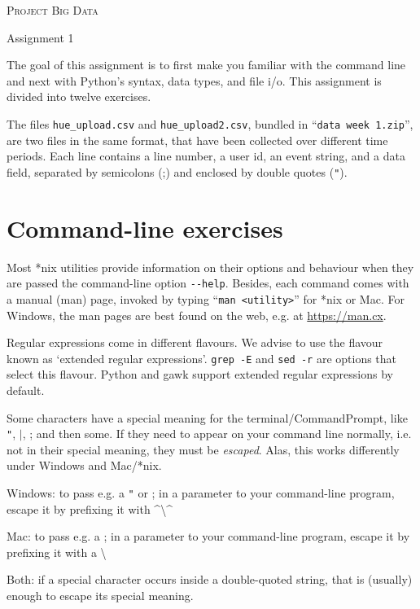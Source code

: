 \documentclass[a4paper]{report}
\theoremstyle{definition}
\newcommand{\blankline}{\par\vspace{5mm}}
\newcommand{\doublequote}{\texttt{"}}
\newcommand{\pipe}{$\vert$}
\begin{document}
	
	\begin{center}
		\textsc{\Large Project Big Data}
		\blankline
		
		{\large Assignment 1}
	\end{center}
	
	\blankline \noindent The goal of this assignment is to first make you familiar with the command line and next with Python’s syntax, data types, and file i/o. This assignment is divided into twelve exercises.
	
	The files \texttt{hue\_upload.csv} and \texttt{hue\_upload2.csv}, bundled in ``\texttt{data week 1.zip}'',
	are two files in the same format, that have been collected over different time periods. Each line contains a line number, a user id, an event string, and a data field, separated by semicolons (;) and enclosed by double quotes (\doublequote{}).
	
	\section*{Command-line exercises}
	\label{command-line-exercises}
	
	Most *nix utilities provide information on their options and behaviour when
	they are passed the command-line option \texttt{-{}-help}. Besides, each
	command comes with a manual (man) page, invoked by typing ``\texttt{man
		<utility>}'' for
	*nix or Mac. For Windows, the man pages are best found on the web, e.g.
	at \url{https://man.cx}.
	
	Regular expressions come in different flavours. We advise to use the flavour
	known as `extended regular expressions'. \texttt{grep -E} and \texttt{sed -r}
	are options that select this flavour. Python and gawk support extended regular
	expressions by default.

	Some characters have a special meaning for the terminal/CommandPrompt,
	like \doublequote{}, \pipe, ; and then some. If they need to appear on
	your command line normally, i.e. not in their special meaning, they
	must be \emph{escaped}. Alas, this works differently under Windows
	and Mac/*nix.

	Windows: to pass e.g. a \doublequote{} or ; in a parameter to your
	command-line program, escape it by prefixing it with
	\^{}\textbackslash\^{}

	Mac: to pass e.g. a ; in a parameter to your command-line program,
	escape it by prefixing it with a \textbackslash

	Both: if a special character occurs inside a double-quoted string,
	that is (usually) enough to escape its special meaning.
	
\end{document}
